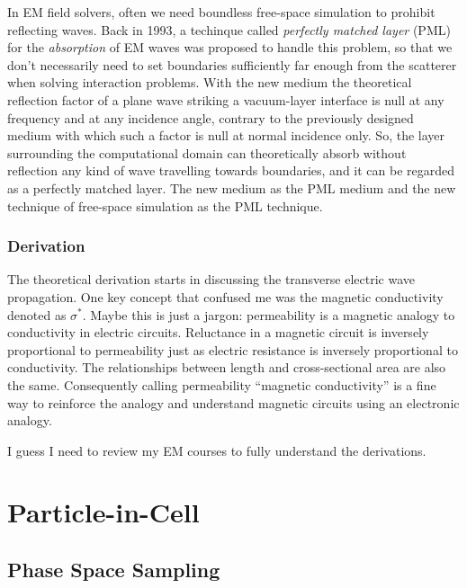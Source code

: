 \documentclass[
  notoc %
]{tufte-book}
\begin{document}
In EM field solvers, often we need boundless free-space simulation to
prohibit reflecting waves. Back in 1993, a techinque called
\emph{perfectly matched layer} (PML) for the \emph{absorption} of EM
waves was proposed to handle this problem, so that we don't necessarily
need to set boundaries sufficiently far enough from the scatterer when
solving interaction problems. With the new medium the theoretical
reflection factor of a plane wave striking a vacuum-layer interface is
null at any frequency and at any incidence angle, contrary to the
previously designed medium with which such a factor is null at normal
incidence only. So, the layer surrounding the computational domain can
theoretically absorb without reflection any kind of wave travelling
towards boundaries, and it can be regarded as a perfectly matched layer.
The new medium as the PML medium and the new technique of free-space
simulation as the PML technique.

\hypertarget{derivation}{%
\subsection{Derivation}\label{derivation}}

The theoretical derivation starts in discussing the transverse electric
wave propagation. One key concept that confused me was the magnetic
conductivity denoted as \(\sigma^\ast\). Maybe this is just a jargon:
permeability is a magnetic analogy to conductivity in electric circuits.
Reluctance in a magnetic circuit is inversely proportional to
permeability just as electric resistance is inversely proportional to
conductivity. The relationships between length and cross-sectional area
are also the same. Consequently calling permeability ``magnetic
conductivity'' is a fine way to reinforce the analogy and understand
magnetic circuits using an electronic analogy.

I guess I need to review my EM courses to fully understand the
derivations.

\hypertarget{sec:pic}{%
\chapter{Particle-in-Cell}\label{sec:pic}}

\hypertarget{phase-space-sampling}{%
\section{Phase Space Sampling}\label{phase-space-sampling}}
\end{document}
